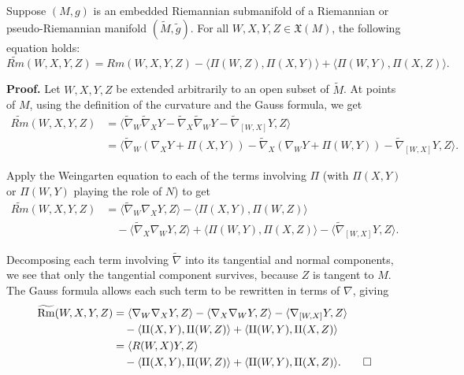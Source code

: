 \begin{theorem}
\label{thm:gauss-equation}

Suppose $(M, g)$ is an embedded Riemannian submanifold of a Riemannian or pseudo-Riemannian manifold $(\widetilde{M}, \widetilde{g})$. For all $W, X, Y, Z \in \mathfrak{X}(M)$, the following equation holds:
\[
\widetilde{Rm}(W, X, Y, Z) = Rm(W, X, Y, Z) - \langle \Pi(W, Z), \Pi(X, Y) \rangle + \langle \Pi(W, Y), \Pi(X, Z) \rangle.
\]
\end{theorem}

\noindent\textbf{Proof.} Let $W, X, Y, Z$ be extended arbitrarily to an open subset of $\widetilde{M}$. At points of $M$, using the definition of the curvature and the Gauss formula, we get
\begin{align*}
\widetilde{Rm}(W, X, Y, Z) &= \langle \widetilde{\nabla}_W \widetilde{\nabla}_X Y - \widetilde{\nabla}_X \widetilde{\nabla}_W Y - \widetilde{\nabla}_{[W,X]} Y, Z \rangle\\
&= \langle \widetilde{\nabla}_W (\nabla_X Y + \Pi(X,Y)) - \widetilde{\nabla}_X (\nabla_W Y + \Pi(W,Y)) - \widetilde{\nabla}_{[W,X]} Y, Z \rangle.
\end{align*}

Apply the Weingarten equation to each of the terms involving $\Pi$ (with $\Pi(X,Y)$ or $\Pi(W,Y)$ playing the role of $N$) to get
\begin{align*}
\widetilde{Rm}(W, X, Y, Z) &= \langle \widetilde{\nabla}_W \nabla_X Y, Z \rangle - \langle \Pi(X, Y), \Pi(W, Z) \rangle\\
&\quad - \langle \widetilde{\nabla}_X \nabla_W Y, Z \rangle + \langle \Pi(W, Y), \Pi(X, Z) \rangle - \langle \widetilde{\nabla}_{[W,X]} Y, Z \rangle.
\end{align*}

Decomposing each term involving $\tilde{\nabla}$ into its tangential and normal components, we see that only the tangential component survives, because $Z$ is tangent to $M$. The Gauss formula allows each such term to be rewritten in terms of $\nabla$, giving
\begin{align*}
\widetilde{\mathrm{Rm}}(W, X, Y, Z) &= \langle \nabla_W \nabla_X Y, Z \rangle - \langle \nabla_X \nabla_W Y, Z \rangle - \langle \nabla_{[W,X]} Y, Z \rangle \\
&\quad - \langle \text{II}(X, Y), \text{II}(W, Z) \rangle + \langle \text{II}(W, Y), \text{II}(X, Z) \rangle \\
&= \langle R(W, X)Y, Z \rangle \\
&\quad - \langle \text{II}(X, Y), \text{II}(W, Z) \rangle + \langle \text{II}(W, Y), \text{II}(X, Z) \rangle. \qed
\end{align*}

